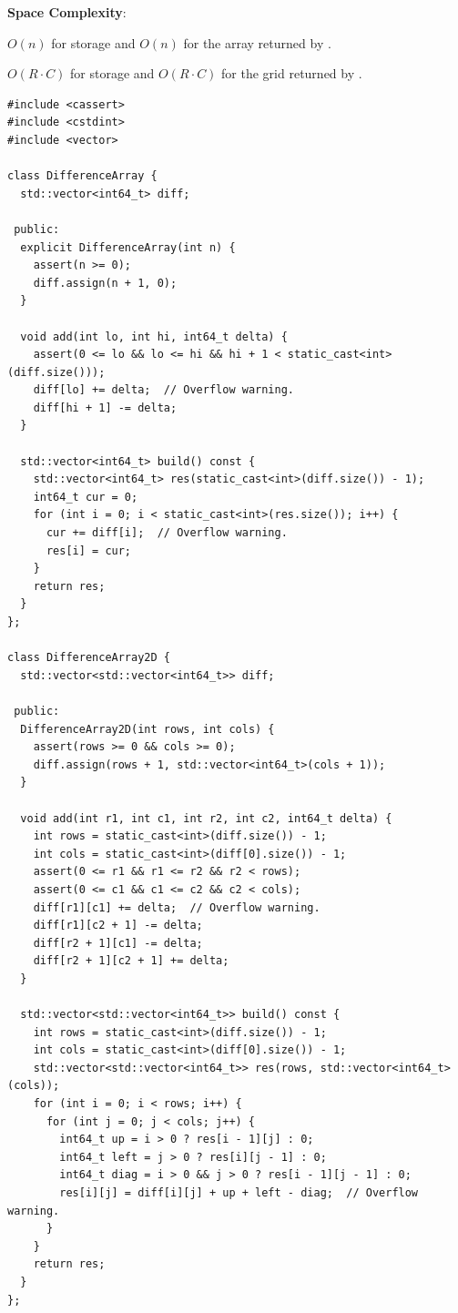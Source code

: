 \textbf{Space Complexity}:
\begin{compactitem}
  \item $O(n)$ for storage and $O(n)$ for the array returned by .
  \item $O(R \cdot C)$ for storage and $O(R \cdot C)$ for the grid returned by .
\end{compactitem}

\begin{lstlisting}[style=cpp]
#include <cassert>
#include <cstdint>
#include <vector>

class DifferenceArray {
  std::vector<int64_t> diff;

 public:
  explicit DifferenceArray(int n) {
    assert(n >= 0);
    diff.assign(n + 1, 0);
  }

  void add(int lo, int hi, int64_t delta) {
    assert(0 <= lo && lo <= hi && hi + 1 < static_cast<int>(diff.size()));
    diff[lo] += delta;  // Overflow warning.
    diff[hi + 1] -= delta;
  }

  std::vector<int64_t> build() const {
    std::vector<int64_t> res(static_cast<int>(diff.size()) - 1);
    int64_t cur = 0;
    for (int i = 0; i < static_cast<int>(res.size()); i++) {
      cur += diff[i];  // Overflow warning.
      res[i] = cur;
    }
    return res;
  }
};

class DifferenceArray2D {
  std::vector<std::vector<int64_t>> diff;

 public:
  DifferenceArray2D(int rows, int cols) {
    assert(rows >= 0 && cols >= 0);
    diff.assign(rows + 1, std::vector<int64_t>(cols + 1));
  }

  void add(int r1, int c1, int r2, int c2, int64_t delta) {
    int rows = static_cast<int>(diff.size()) - 1;
    int cols = static_cast<int>(diff[0].size()) - 1;
    assert(0 <= r1 && r1 <= r2 && r2 < rows);
    assert(0 <= c1 && c1 <= c2 && c2 < cols);
    diff[r1][c1] += delta;  // Overflow warning.
    diff[r1][c2 + 1] -= delta;
    diff[r2 + 1][c1] -= delta;
    diff[r2 + 1][c2 + 1] += delta;
  }

  std::vector<std::vector<int64_t>> build() const {
    int rows = static_cast<int>(diff.size()) - 1;
    int cols = static_cast<int>(diff[0].size()) - 1;
    std::vector<std::vector<int64_t>> res(rows, std::vector<int64_t>(cols));
    for (int i = 0; i < rows; i++) {
      for (int j = 0; j < cols; j++) {
        int64_t up = i > 0 ? res[i - 1][j] : 0;
        int64_t left = j > 0 ? res[i][j - 1] : 0;
        int64_t diag = i > 0 && j > 0 ? res[i - 1][j - 1] : 0;
        res[i][j] = diff[i][j] + up + left - diag;  // Overflow warning.
      }
    }
    return res;
  }
};
\end{lstlisting}
